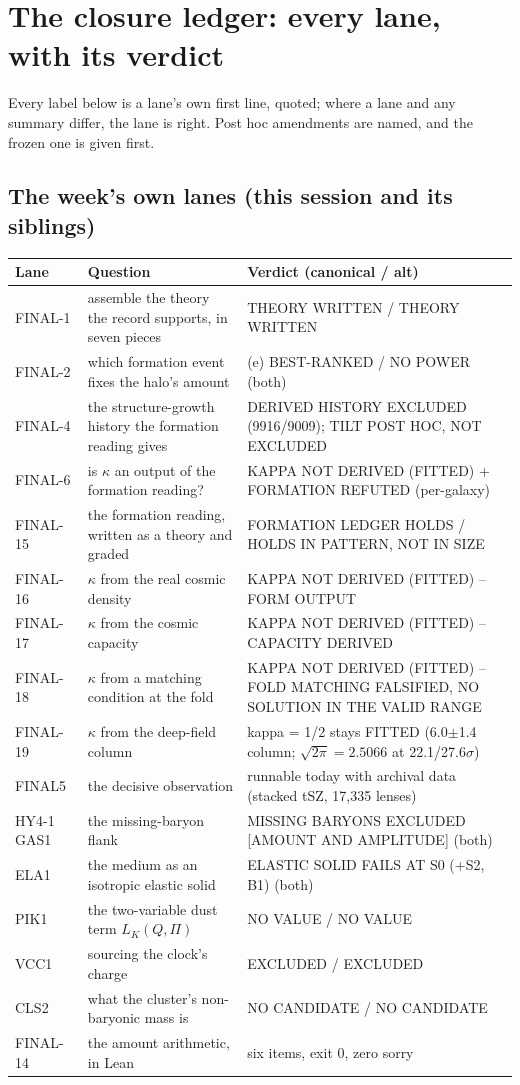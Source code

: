 \documentclass[10pt]{article}
\begin{document}
\section{The closure ledger: every lane, with its verdict}
\label{sec:ledger}

Every label below is a lane's own first line, quoted; where a lane and any summary differ, the lane is right.
Post hoc amendments are named, and the frozen one is given first.

\subsection{The week's own lanes (this session and its siblings)}
{\small
\begin{longtable}{@{}p{}p{}p{}@{}}
\toprule
Lane & Question & Verdict (canonical / alt)\\\midrule
\endhead
FINAL-1 & assemble the theory the record supports, in seven pieces & THEORY WRITTEN / THEORY WRITTEN\\
FINAL-2 & which formation event fixes the halo's amount & (e) BEST-RANKED / NO POWER (both)\\
FINAL-4 & the structure-growth history the formation reading gives & DERIVED HISTORY EXCLUDED (9916/9009); TILT POST HOC, NOT EXCLUDED\\
FINAL-6 & is $\kappa$ an output of the formation reading? & KAPPA NOT DERIVED (FITTED) + FORMATION REFUTED (per-galaxy)\\
FINAL-15 & the formation reading, written as a theory and graded & FORMATION LEDGER HOLDS / HOLDS IN PATTERN, NOT IN SIZE\\
FINAL-16 & $\kappa$ from the real cosmic density & KAPPA NOT DERIVED (FITTED) -- FORM OUTPUT\\
FINAL-17 & $\kappa$ from the cosmic capacity & KAPPA NOT DERIVED (FITTED) -- CAPACITY DERIVED\\
FINAL-18 & $\kappa$ from a matching condition at the fold & KAPPA NOT DERIVED (FITTED) -- FOLD MATCHING FALSIFIED, NO SOLUTION IN THE VALID RANGE\\
FINAL-19 & $\kappa$ from the deep-field column & kappa = 1/2 stays FITTED (6.0$\pm$1.4 column; $\sqrt{2\pi}=2.5066$ at 22.1/27.6$\sigma$)\\
FINAL5 & the decisive observation & runnable today with archival data (stacked tSZ, 17,335 lenses)\\
HY4-1 GAS1 & the missing-baryon flank & MISSING BARYONS EXCLUDED [AMOUNT AND AMPLITUDE] (both)\\
ELA1 & the medium as an isotropic elastic solid & ELASTIC SOLID FAILS AT S0 (+S2, B1) (both)\\
PIK1 & the two-variable dust term $L_K(Q,\Pi)$ & NO VALUE / NO VALUE\\
VCC1 & sourcing the clock's charge & EXCLUDED / EXCLUDED\\
CLS2 & what the cluster's non-baryonic mass is & NO CANDIDATE / NO CANDIDATE\\
FINAL-14 & the amount arithmetic, in Lean & six items, exit 0, zero sorry\\
\bottomrule
\end{longtable}}
\end{document}
